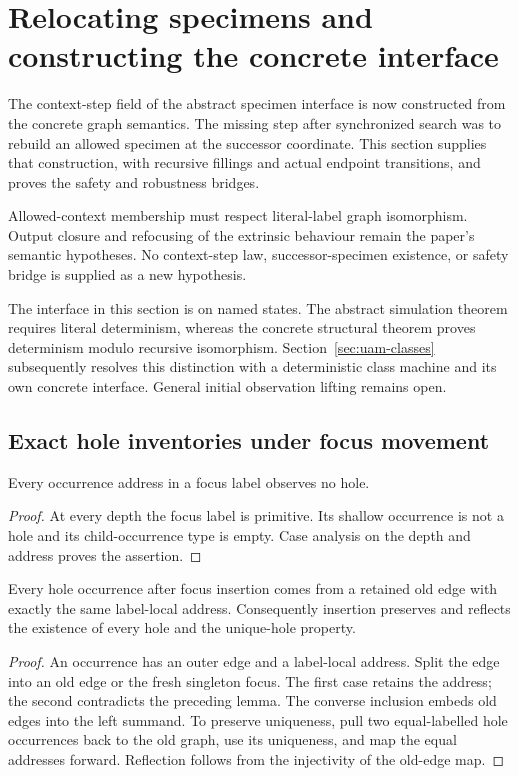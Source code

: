 \section{Relocating specimens and constructing the concrete interface}
\label{sec:concrete-specimen-system}
The context-step field of the abstract specimen interface is now constructed
from the concrete graph semantics. The missing step after synchronized search
was to rebuild an allowed specimen at the successor coordinate. This section
supplies that construction, with recursive fillings and actual endpoint
transitions, and proves the safety and robustness bridges.

Allowed-context membership must respect literal-label graph isomorphism.
Output closure and refocusing of the extrinsic behaviour remain the paper's
semantic hypotheses. No context-step law, successor-specimen existence,
or safety bridge is supplied as a new hypothesis.

The interface in this section is on named states. The abstract simulation
theorem requires literal determinism, whereas the concrete structural theorem
proves determinism modulo recursive isomorphism. Section~\ref{sec:uam-classes}
subsequently resolves this distinction with a deterministic class machine and
its own concrete interface. General initial observation lifting remains open.

\subsection{Exact hole inventories under focus movement}
\begin{lemma}
Every occurrence address in a focus label observes no hole.
\end{lemma}
\begin{proof}
At every depth the focus label is primitive. Its shallow occurrence is not a
hole and its child-occurrence type is empty. Case analysis on the depth and
address proves the assertion.
\end{proof}


\begin{lemma}
Every hole occurrence after focus insertion comes from a retained old edge
with exactly the same label-local address. Consequently insertion preserves
and reflects the existence of every hole and the unique-hole property.
\end{lemma}
\begin{proof}
An occurrence has an outer edge and a label-local address. Split the edge into
an old edge or the fresh singleton focus. The first case retains the address;
the second contradicts the preceding lemma. The converse inclusion embeds old
edges into the left summand. To preserve uniqueness, pull two equal-labelled
hole occurrences back to the old graph, use its uniqueness, and map the equal
addresses forward. Reflection follows from the injectivity of the old-edge map.
\end{proof}


